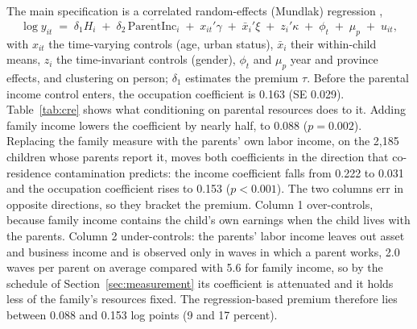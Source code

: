\documentclass[11pt]{article}
\newcommand{\pinc}{\overline{\mathrm{ParentInc}}}
\begin{document}
The main specification is a correlated random-effects (Mundlak)
regression \citep{Mundlak1978},
\begin{equation}
\log y_{it} \;=\; \delta_1 H_i \;+\; \delta_2\, \pinc_i \;+\; x_{it}'\gamma \;+\; \bar x_i'\xi \;+\; z_i'\kappa \;+\; \phi_t \;+\; \mu_p \;+\; u_{it},
\label{eq:cre}
\end{equation}
with $x_{it}$ the time-varying controls (age, urban status), $\bar x_i$
their within-child means, $z_i$ the time-invariant controls (gender), $\phi_t$ and $\mu_p$ year and province
effects, and clustering on person; $\delta_1$ estimates the premium
$\tau$. Before the parental income control enters, the occupation coefficient is 0.163 (SE 0.029).
Table~\ref{tab:cre} shows what conditioning on parental resources does
to it. Adding family income lowers the coefficient by nearly half, to 0.088 ($p = 0.002$). Replacing the family measure with the parents' own labor income, on the 2,185 children whose parents report it, moves
both coefficients in the direction that co-residence contamination
predicts: the income coefficient falls from 0.222 to 0.031 and the occupation coefficient rises to 0.153 ($p < 0.001$). The two columns err in opposite directions, so they bracket the premium. Column 1 over-controls, because family income contains the child's own earnings when the child lives with the parents. Column 2 under-controls: the parents' labor income leaves out asset and business income and is observed only in waves in which a parent works, 2.0 waves per parent on average compared with 5.6 for family income, so by the schedule of Section~\ref{sec:measurement} its coefficient is attenuated and it holds less of the family's resources fixed. The regression-based premium therefore lies between 0.088 and 0.153 log points (9 and 17 percent).
\end{document}
